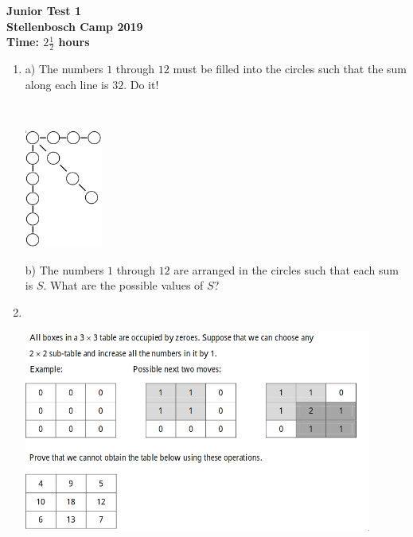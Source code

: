\documentclass{article}
\begin{document}
\thispagestyle{empty}

\begin{center}
  \textbf{\Large Junior Test 1}
  \\ \vspace{1em}
  \textbf{\large Stellenbosch Camp 2019}
  \\ \vspace{1em}
  \textbf{\large Time: $2\frac{1}{2}$ hours}
\end{center}

\vspace{6.81mm}

\begin{enumerate}[1.]

\item %
a) The numbers $1$ through $12$ must be filled into the circles such that the sum along each line is $32$. Do it!

~
\begin{center}
    \includegraphics[width=0.2\textwidth]{test_1_question_1}
\end{center}
b) The numbers $1$ through $12$ are arranged in the circles such that each sum is $S$. What are the possible values of $S$?
\vspace{6.81mm}

\item %
~
\begin{center}
    \includegraphics[width=0.9\textwidth]{test_1_question_2}
\end{center}
\vspace{6.81mm}


\end{enumerate}
\end{document}
